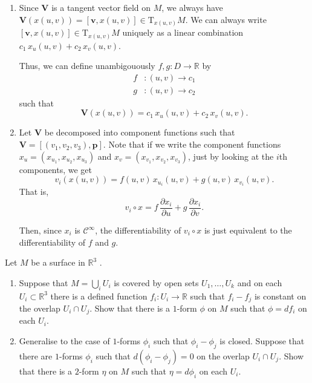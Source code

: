 \documentclass[12 pt, letterpaper]{hmcpset}
\begin{document}
\begin{solution}
	\begin{enumerate}
		\item
			Since $\mathbf{V}$ is a tangent vector field on $M$, we always have $\mathbf{V}(x(u, v)) = [\mathbf{v}, x(u, v)] \in \mathrm{T}_{x(u, v)} M$. We can always write $[\mathbf{v}, x(u, v)] \in \mathrm{T}_{x(u, v)} M$ uniquely as a linear combination $c_{1} \, x_{u}(u, v) + c_{2} \, x_{v}(u, v)$. 

			Thus, we can define unambigouously $f, g : D \to \mathbb{R}$ by
			\[
				\begin{split}
					f & : (u, v) \to c_1  \\
					g & : (u, v) \to c_{2}
				\end{split}
			\]
			such that
			\[
				\mathbf{V}(x(u, v)) = c_{1} \, x_{u}(u, v) + c_2 \, x_{v}(u, v).
			\]
		\item
			Let $\mathbf{V}$ be decomposed into component functions such that $\mathbf{V} = [(v_{1}, v_{2}, v_{3}), \mathbf{p}]$. Note that if we write the component functions $x_{u} = (x_{u_{1}}, x_{u_{2}}, x_{u_{3}})$ and $x_{v} = (x_{v_{1}}, x_{v_{2}}, x_{v_{3}})$, just by looking at the $i$th components, we get
			\[
				v_{i}(x(u, v)) = f(u, v) \, x_{u_{i}}(u, v) + g(u, v) \, x_{v_i}(u, v).
			\]
			That is,
			\[
				v_{i} \circ x = f \, \frac{\partial x_{i}}{\partial u} + g \, \frac{\partial x_{i}}{\partial v}.
			\] 

			Then, since $x_{i}$ is $\mathcal{C}^{\infty}$, the differentiability of $v_{i} \circ x$ is just equivalent to the differentiability of $f$ and $g$.
	\end{enumerate}
\end{solution}

\pagebreak

\begin{problem}[Problem 4.]
	Let $M$  be a surface in $\mathbb{R}^{3}$ .
	\begin{enumerate}
		\item Suppose that $M = \bigcup_{i} U_{i}$ is covered by open sets $U_{1}, \dots, U_{k}$ and on each $U_{i} \subset \mathbb{R}^{3}$ there is a defined function $f_{i} : U_{i} \to \mathbb{R}$ such that $f_{i} - f_{j}$ is constant on the overlap $U_{i} \cap U_{j}$. Show that there is a $1$-form $\phi$ on $M$ such that $\phi = df_{i}$ on each $U_{i}$.
		\item Generalise to the case of $1$-forms $\phi_{i}$ such that $\phi_{i} - \phi_{j}$ is closed. Suppose that there are $1$-forms $\phi_{i}$ such that $d(\phi_{i} - \phi_{j}) = 0$ on the overlap $U_{i} \cap U_{j}$. Show that there is a $2$-form $\eta$ on $M$ such that $\eta = d\phi_{i}$ on each $U_{i}$.
	\end{enumerate}
\end{problem}
\end{document}
